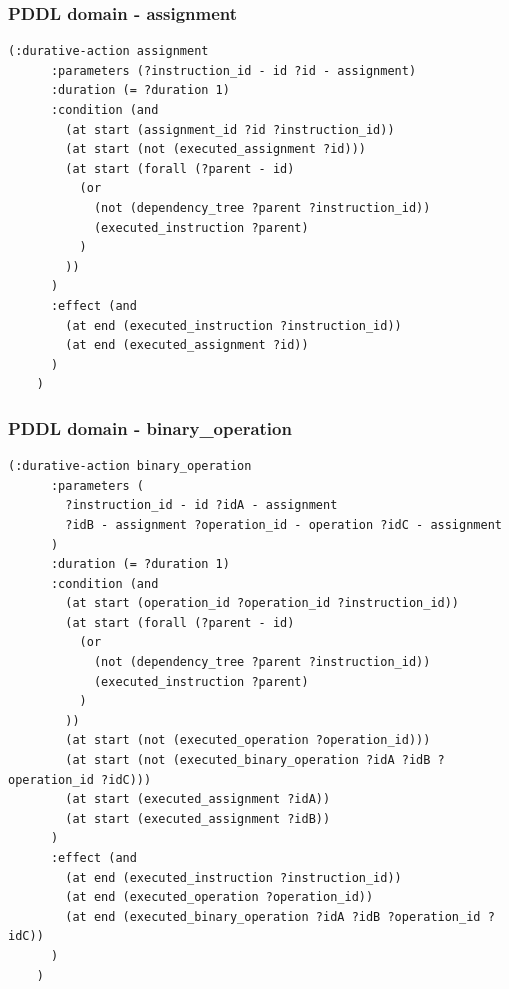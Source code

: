 \documentclass{beamer}
\begin{document}
\begin{frame}[fragile]
  \frametitle{PDDL domain - assignment}

  \begin{lstlisting}[style=pddlStyle,basicstyle=\ttfamily\fontsize{10pt}{10pt}\selectfont]
    (:durative-action assignment
      :parameters (?instruction_id - id ?id - assignment)
      :duration (= ?duration 1)
      :condition (and
        (at start (assignment_id ?id ?instruction_id))
        (at start (not (executed_assignment ?id)))
        (at start (forall (?parent - id)
          (or
            (not (dependency_tree ?parent ?instruction_id))
            (executed_instruction ?parent)
          )
        ))
      )
      :effect (and
        (at end (executed_instruction ?instruction_id))
        (at end (executed_assignment ?id))
      )
    )
  \end{lstlisting}
\end{frame}

\begin{frame}[fragile]
  \frametitle{PDDL domain - binary\_operation}

  \begin{lstlisting}[style=pddlStyle,basicstyle=\ttfamily\fontsize{8pt}{8pt}\selectfont]
    (:durative-action binary_operation
      :parameters (
        ?instruction_id - id ?idA - assignment
        ?idB - assignment ?operation_id - operation ?idC - assignment
      )
      :duration (= ?duration 1)
      :condition (and
        (at start (operation_id ?operation_id ?instruction_id))
        (at start (forall (?parent - id)
          (or
            (not (dependency_tree ?parent ?instruction_id))
            (executed_instruction ?parent)
          )
        ))
        (at start (not (executed_operation ?operation_id)))
        (at start (not (executed_binary_operation ?idA ?idB ?operation_id ?idC)))
        (at start (executed_assignment ?idA))
        (at start (executed_assignment ?idB))
      )
      :effect (and
        (at end (executed_instruction ?instruction_id))
        (at end (executed_operation ?operation_id))
        (at end (executed_binary_operation ?idA ?idB ?operation_id ?idC))
      )
    )
  \end{lstlisting}
\end{frame}
\end{document}
